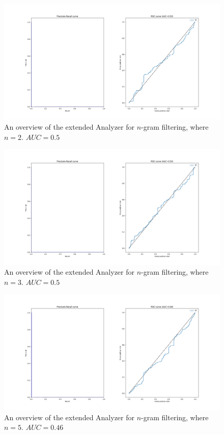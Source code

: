 \documentclass[11pt]{article}
\begin{document}
\begin{figure}[htp]
    \centering
    \includegraphics[width=\textwidth]{images/customAna-n2}
    \caption{An overview of the extended Analyzer for $n$-gram filtering, where $n = 2$. $AUC = 0.5$}
    \label{fig:ngram2}
\end{figure}
\begin{figure}[htp]
	\centering
	\includegraphics[width=\textwidth]{images/customAna-n3}
	\caption{An overview of the extended Analyzer for $n$-gram filtering, where $n = 3$. $AUC = 0.5$}
	\label{fig:ngram3}
\end{figure}
\begin{figure}[htp]
	\centering
	\includegraphics[width=\textwidth]{images/customAna-n5}
	\caption{An overview of the extended Analyzer for $n$-gram filtering, where $n = 5$. $AUC = 0.46$}
	\label{fig:ngram5}
\end{figure}
\end{document}
